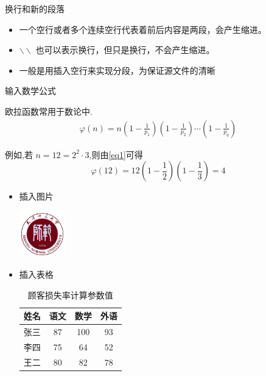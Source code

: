 \documentclass[13pt]{ctexbeamer}
\begin{document}
\begin{frame}{换行和新的段落}
    \begin{itemize}
        \item 一个空行或者多个连续空行代表着前后内容是两段，会产生缩进。


        \item  $\backslash\backslash$ 也可以表示换行，但只是换行，不会产生缩进。


        \item 一般是用插入空行来实现分段，为保证源文件的清晰

    \end{itemize}
\end{frame}

\begin{frame}{输入数学公式}

    欧拉函数常用于数论中.
    \begin{align}\label{eq1}
        \varphi(n)=n\left(1-\frac{1}{p_{1}}\right)\left(1-\frac{1}{p_{2}}\right) \cdots\left(1-\frac{1}{p_{q}}\right)
    \end{align}

    例如,若 $n=12=2^{2} \cdot 3$,则由\eqref{eq1}可得
    $$
    \varphi(12)=12\left(1-\frac{1}{2}\right)\left(1-\frac{1}{3}\right)=4
    $$


\end{frame}

\begin{frame}
    \begin{itemize}
        \item 插入图片
        \begin{center}
            \includegraphics[width=2cm]{tjnu.jpg}
        \end{center}

        \item 插入表格
        \begin{table}
            \centering
            \caption{顾客损失率计算参数值}
            \begin{tabular}{|l||c|c|c|}
                \hline
                姓名 & 语文 & 数学 & 外语  \\
                \hline  \hline
                张三 & 87 & 100 & 93 \\
                \hline
                李四 & 75 & 64 & 52  \\
                \hline
                王二 & 80 & 82 & 78  \\
                \hline
            \end{tabular}
        \end{table}
    \end{itemize}



\end{frame}
\end{document}
